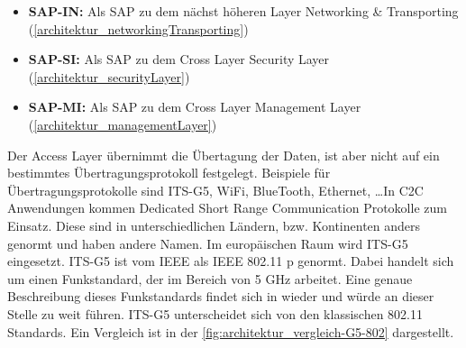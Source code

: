 \begin{itemize}
	\item \textbf{SAP-IN: } Als \ac{SAP} zu dem nächst höheren Layer  Networking \& Transporting (\autoref{architektur_networkingTransporting})
	\item \textbf{SAP-SI: } Als \ac{SAP} zu dem Cross Layer Security Layer (\autoref{architektur_securityLayer})
	\item \textbf{SAP-MI: } Als \ac{SAP} zu dem Cross Layer Management Layer (\autoref{architektur_managementLayer})
\end{itemize}

Der Access Layer übernimmt die Übertagung der Daten, ist aber nicht auf ein bestimmtes Übertragungsprotokoll festgelegt. Beispiele für Übertragungsprotokolle sind ITS-G5, WiFi, BlueTooth, Ethernet, \dots In \ac{C2C} Anwendungen kommen Dedicated Short Range Communication Protokolle zum Einsatz. Diese sind in unterschiedlichen Ländern, bzw. Kontinenten anders genormt und haben andere Namen. Im europäischen Raum wird \ac{ITS-G5} eingesetzt. \ac{ITS-G5} ist vom \ac{IEEE} als \ac{IEEE} 802.11 p genormt. Dabei handelt sich um einen Funkstandard, der im Bereich von 5 GHz arbeitet. Eine genaue Beschreibung dieses Funkstandards findet sich in \cite{en302663} wieder und würde an dieser Stelle zu weit führen. \ac{ITS-G5} unterscheidet sich von den klassischen 802.11 Standards. Ein Vergleich ist in der \autoref{fig:architektur_vergleich-G5-802} dargestellt. 

